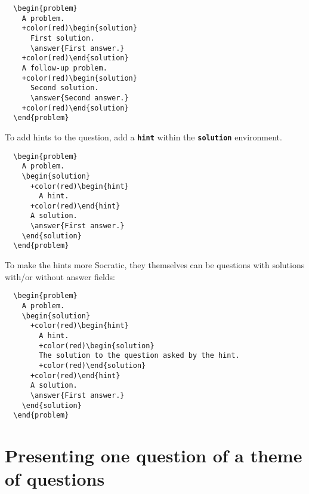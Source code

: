 \documentclass{amsart}
\newcommand\code[1]{{\bfseries\texttt{#1}}}
\begin{document}
\begin{Verbatim}
  \begin{problem}
    A problem. 
    +color(red)\begin{solution}
      First solution. 
      \answer{First answer.}
    +color(red)\end{solution}
    A follow-up problem.
    +color(red)\begin{solution}
      Second solution. 
      \answer{Second answer.}
    +color(red)\end{solution}
  \end{problem}
\end{Verbatim}


To add hints to the question, add a \code{hint} within the
\code{solution} environment.



\begin{Verbatim}
  \begin{problem}
    A problem. 
    \begin{solution}
      +color(red)\begin{hint}
        A hint.
      +color(red)\end{hint}
      A solution. 
      \answer{First answer.}
    \end{solution}
  \end{problem}
\end{Verbatim}

To make the hints more Socratic, they themselves can be questions
with solutions with/or without answer fields:

\begin{Verbatim}
  \begin{problem}
    A problem. 
    \begin{solution}
      +color(red)\begin{hint}
        A hint.
        +color(red)\begin{solution}
        The solution to the question asked by the hint.
        +color(red)\end{solution}
      +color(red)\end{hint}
      A solution. 
      \answer{First answer.}
    \end{solution}
  \end{problem}
\end{Verbatim}



\section{Presenting one question of a theme of questions}
\end{document}
